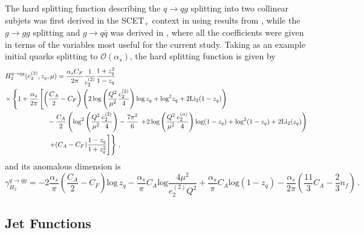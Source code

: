 \documentclass[a4paper,11pt]{article}
\newcommand{\ecf}[2]{e_{#1}^{(#2)}}
\def\log{\text{log}}
\newcommand{\nn}{\nonumber}
\begin{document}
The hard splitting function describing the $q\to qg$ splitting into two collinear subjets was first derived in the SCET$_+$ context in \cite{Bauer:2011uc} using results from \cite{Ellis:1980wv,Kosower:1999rx}, while the $g\rightarrow gg$ splitting and $g\rightarrow q\bar{q}$ was derived in \cite{Larkoski:2015kga}, where all the coefficients were given in terms of the variables most useful for the current study. Taking as an example initial quarks splitting to $\mathcal{O}(\alpha_s)$, the hard splitting function is given by
\begin{align}
H_2^{q\to qg}(\ecf{2}{2},z_q,\mu)&= \frac{\alpha_s C_F}{2\pi} \frac{1}{  \ecf{2}{2}      } \frac{1+z_q^2}{1-z_q}   
\\
& \hspace{-2.75cm}\times\left \{ 1+\frac{\alpha_s}{2\pi} \left[ \left( \frac{C_A}{2} -C_F \right) \left( 2\, \log\left( \frac{Q^2}{\mu^2} \frac{   \ecf{2}{2}    }{4} \right) \log\, z_q +\log^2 z_q +2\text{Li}_2(1-z_q)  \right) \right. \right. \nonumber \\
&\hspace{-0.5cm} -\frac{C_A}{2} \left (  \log^2 \left( \frac{Q^2}{\mu^2} \frac{   \ecf{2}{2}     }{4} \right)-\frac{7\pi^2}{6}  \left. \left.+2\,\log \left( \frac{Q^2}{\mu^2} \frac{    \ecf{2}{\alpha}      }{4} \right)\log (1-z_q) +\log^2(1-z_q)+2\text{Li}_2 (z_q) \right) \right. \right. \nn \\
&\left. \left. \hspace{-0.5cm}+ \vphantom{ \log^2 \left( \frac{Q^2}{\mu^2} \frac{   \ecf{2}{2}     }{4}  \right) }(C_A-C_F)\frac{1-z_q}{1+z_q^2} \right] \right\}\,,\nonumber
\end{align}
and its anomalous dimension is
\begin{equation}
\gamma_{H_2}^{q\to qg} = -2\frac{\alpha_s}{\pi}\left(
\frac{C_A}{2}-C_F
\right)\log\, z_q-\frac{\alpha_s}{\pi}C_A\log\frac{4\mu^2}{\ecf{2}{2}Q^2}+\frac{\alpha_s}{\pi}C_A \log(1-z_q)-\frac{\alpha_s}{2\pi}\left(
\frac{11}{3}C_A-\frac{2}{3}n_f
\right)\,.
\end{equation}


\subsection{Jet Functions}\label{app:jetcoll}
\end{document}
